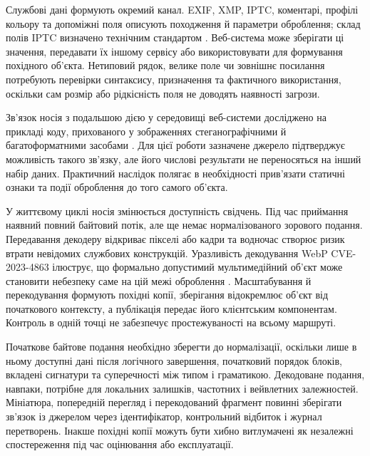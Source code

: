 Службові дані формують окремий канал. EXIF, XMP, IPTC, коментарі, профілі кольору та допоміжні поля описують походження й параметри оброблення; склад полів IPTC визначено технічним стандартом \cite{iptc2024metadata}. Веб-система може зберігати ці значення, передавати їх іншому сервісу або використовувати для формування похідного об’єкта. Нетиповий рядок, велике поле чи зовнішнє посилання потребують перевірки синтаксису, призначення та фактичного використання, оскільки сам розмір або рідкісність поля не доводять наявності загрози.

Зв’язок носія з подальшою дією у середовищі веб-системи досліджено на прикладі коду, прихованого у зображеннях стеганографічними й багатоформатними засобами \cite{iglesias2023driveby}. Для цієї роботи зазначене джерело підтверджує можливість такого зв’язку, але його числові результати не переносяться на інший набір даних. Практичний наслідок полягає в необхідності прив’язати статичні ознаки та події оброблення до того самого об’єкта.

У життєвому циклі носія змінюється доступність свідчень. Під час приймання наявний повний байтовий потік, але ще немає нормалізованого зорового подання. Передавання декодеру відкриває пікселі або кадри та водночас створює ризик втрати невідомих службових конструкцій. Уразливість декодування WebP CVE-2023-4863 ілюструє, що формально допустимий мультимедійний об’єкт може становити небезпеку саме на цій межі оброблення \cite{nvd2023webp}. Масштабування й перекодування формують похідні копії, зберігання відокремлює об’єкт від початкового контексту, а публікація передає його клієнтським компонентам. Контроль в одній точці не забезпечує простежуваності на всьому маршруті.

Початкове байтове подання необхідно зберегти до нормалізації, оскільки лише в ньому доступні дані після логічного завершення, початковий порядок блоків, вкладені сигнатури та суперечності між типом і граматикою. Декодоване подання, навпаки, потрібне для локальних залишків, частотних і вейвлетних залежностей. Мініатюра, попередній перегляд і перекодований фрагмент повинні зберігати зв’язок із джерелом через ідентифікатор, контрольний відбиток і журнал перетворень. Інакше похідні копії можуть бути хибно витлумачені як незалежні спостереження під час оцінювання або експлуатації.

